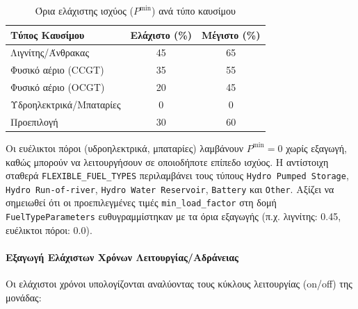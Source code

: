 \begin{table}[htbp]
\centering
\caption{Όρια ελάχιστης ισχύος ($P^{\min}$) ανά τύπο καυσίμου}
\label{tab:p-min-bounds}
\begin{tabular}{@{}lcc@{}}
\toprule
\textbf{Τύπος Καυσίμου} & \textbf{Ελάχιστο (\%)} & \textbf{Μέγιστο (\%)} \\
\midrule
Λιγνίτης/Άνθρακας & 45 & 65 \\
Φυσικό αέριο (CCGT) & 35 & 55 \\
Φυσικό αέριο (OCGT) & 20 & 45 \\
Υδροηλεκτρικά/Μπαταρίες & 0 & 0 \\
Προεπιλογή & 30 & 60 \\
\bottomrule
\end{tabular}
\end{table}

Οι ευέλικτοι πόροι (υδροηλεκτρικά, μπαταρίες) λαμβάνουν $P^{\min} = 0$ χωρίς εξαγωγή, καθώς μπορούν να λειτουργήσουν σε οποιοδήποτε επίπεδο ισχύος. Η αντίστοιχη σταθερά \texttt{FLEXIBLE\_FUEL\_TYPES} περιλαμβάνει τους τύπους \texttt{Hydro Pumped Storage}, \texttt{Hydro Run-of-river}, \texttt{Hydro Water Reservoir}, \texttt{Battery} και \texttt{Other}. Αξίζει να σημειωθεί ότι οι προεπιλεγμένες τιμές \texttt{min\_load\_factor} στη δομή \texttt{FuelTypeParameters} ευθυγραμμίστηκαν με τα όρια εξαγωγής (π.χ. λιγνίτης: 0.45, ευέλικτοι πόροι: 0.0).

\paragraph{Εξαγωγή Ελάχιστων Χρόνων Λειτουργίας/Αδράνειας}
Οι ελάχιστοι χρόνοι υπολογίζονται αναλύοντας τους κύκλους λειτουργίας (on/off) της μονάδας:

